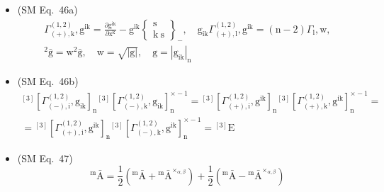 \documentclass[
    12pt,              %
    a4paper,           %
    headings=normal,   %
    twoside=true,      %
    BCOR=8mm,          %
]{scrbook}
\begin{document}
\begin{itemize}[label={},leftmargin=0pt]
    \item (SM Eq.\ 46a) 
    \[
    \begin{gathered}
    \Gamma^{(1,2)}_{(+),\mathrm{k}}, \mathrm{g}^{\mathrm{ik}} = \frac{\partial \mathrm{g}^{\mathrm{ik}}}{\partial \mathrm{x^k}} - \mathrm{g}^{\mathrm{ik}} \left\{ \begin{smallmatrix} \mathrm{s} \\ \mathrm{k\ s} \end{smallmatrix} \right\}_-, \quad \mathrm{g}_{\mathrm{ik}} \Gamma^{(1,2)}_{(+),\mathrm{l}}, \mathrm{g}^{\mathrm{ik}} = (\mathrm{n}-2) \Gamma_\mathrm{l}, \mathrm{w}, \\
    {}^2\bar{\mathrm{g}} = \mathrm{w}^2 \bar{\mathrm{g}}, \quad \mathrm{w} = \sqrt{|\mathrm{g}|}, \quad \mathrm{g} = |\mathrm{g}_{\mathrm{ik}}|_\mathrm{n}
    \end{gathered}
    \]

    \item (SM Eq.\ 46b) 
    \[
    \begin{gathered}
    {}^{[3]}\left[ \Gamma^{(1,2)}_{(-),\mathrm{i}}, \mathrm{g}_{\mathrm{ik}} \right]_\mathrm{n} {}^{[3]}\left[ \Gamma^{(1,2)}_{(-),\mathrm{k}}, \mathrm{g}_{\mathrm{ik}} \right]_\mathrm{n}^{\times -1} = {}^{[3]}\left[ \Gamma^{(1,2)}_{(+),\mathrm{i}}, \mathrm{g}^{\mathrm{ik}} \right]_\mathrm{n} {}^{[3]}\left[ \Gamma^{(1,2)}_{(+),\mathrm{k}}, \mathrm{g}^{\mathrm{ik}} \right]_\mathrm{n}^{\times -1} = \\
    = {}^{[3]}\left[ \Gamma^{(1,2)}_{(+),\mathrm{i}}, \mathrm{g}^{\mathrm{ik}} \right]_\mathrm{n} {}^{[3]}\left[ \Gamma^{(1,2)}_{(-),\mathrm{k}}, \mathrm{g}^{\mathrm{ik}} \right]_\mathrm{n}^{\times -1} = {}^{[3]}\mathrm{E}
    \end{gathered}
    \]

    \item (SM Eq.\ 47) 
    \[
    {}^\mathrm{m}\bar{\mathrm{A}} = \frac{1}{2} \left( {}^\mathrm{m}\bar{\mathrm{A}} + {}^\mathrm{m}\bar{\mathrm{A}}^{\times_{\alpha,\beta}} \right) + \frac{1}{2} \left( {}^\mathrm{m}\bar{\mathrm{A}} - {}^\mathrm{m}\bar{\mathrm{A}}^{\times_{\alpha,\beta}} \right)
    \]


\end{itemize}
\end{document}
